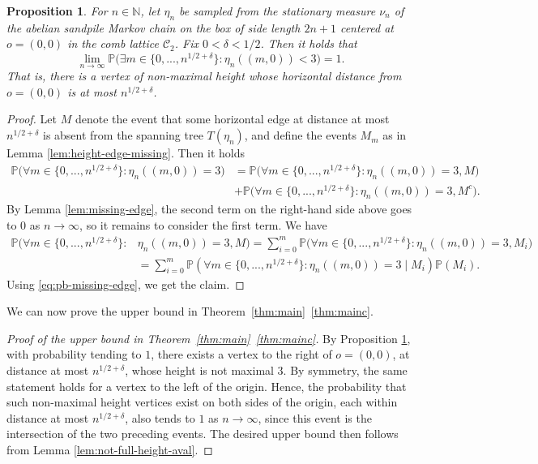 \documentclass[11pt]{article}
\newtheorem{proposition}{Proposition}[section]
\newcommand{\Prob}{\mathbb{P}}
\begin{document}
\begin{proposition}\label{prop:not-full-height}
    For $n\in\mathbb{N}$, let $\eta_n$ be sampled from the stationary measure $\nu_n$ of the abelian sandpile Markov chain on the box of side length $2n+1$ centered at $o=(0,0)$ in the comb lattice $\mathcal{C}_2$. Fix $0<\delta<1/2$. Then it holds that
    $$\lim_{n\to\infty}\Prob\Big(\exists m\in\{0,...,n^{1/2+\delta}\}:\eta_n((m,0))<3\Big)=1.$$
    That is, there is a vertex of non-maximal height whose horizontal distance from $o=(0,0)$ is at most $n^{1/2+\delta}$.
\end{proposition}
\begin{proof}
    Let $M$ denote the event that some horizontal edge at distance at most $n^{1/2+\delta}$ is absent from the spanning tree $T(\eta_n)$, and define the events $M_m$ as in Lemma \ref{lem:height-edge-missing}. Then it holds
    \begin{align*}
    \Prob\big(\forall m\in\{0,...,n^{1/2+\delta}\}:\eta_n((m,0))=3\big)&=\Prob\big(\forall m\in\{0,...,n^{1/2+\delta}\}:\eta_n((m,0))=3,M\big)\\&+\Prob\big(\forall m\in\{0,...,n^{1/2+\delta}\}:\eta_n((m,0))=3,M^c\big).
    \end{align*}
    By Lemma \ref{lem:missing-edge}, the second term on the right-hand side above goes to $0$ as $n\to\infty$, so it remains to consider the first term. We have
    \begin{align*}
        \Prob\big(\forall m\in\{0,...,n^{1/2+\delta}\}:& \eta_n((m,0))=3,  M\big)=\sum_{i=0}^m\Prob\big(\forall m\in\{0,...,n^{1/2+\delta}\}:\eta_n((m,0))=3,M_i\big)\\
        &=\sum_{i=0}^m\Prob(\forall m\in\{0,...,n^{1/2+\delta}\}:\eta_n((m,0))=3\;\vert\;M_i)\Prob(M_i).
    \end{align*}
    Using \eqref{eq:pb-missing-edge}, we get the claim. 
\end{proof}
We can now prove the upper bound in Theorem~\ref{thm:main}~\ref{thm:mainc}.
\begin{proof}[Proof of the upper bound in Theorem~\ref{thm:main}~\ref{thm:mainc}]
By Proposition \ref{prop:not-full-height}, with probability tending to $1$, there exists a vertex to the right of $o=(0,0)$, at distance at most $n^{1/2+\delta}$, whose height is not maximal $3$. By symmetry, the same statement holds for a vertex to the left of the origin. Hence, the probability that such non-maximal height vertices exist on both sides of the origin, each within distance at most $n^{1/2+\delta}$, also tends to $1$ as $n\to\infty$, since this event is the intersection of the two preceding events. The desired upper bound then follows from Lemma \ref{lem:not-full-height-aval}.
\end{proof}
\end{document}

